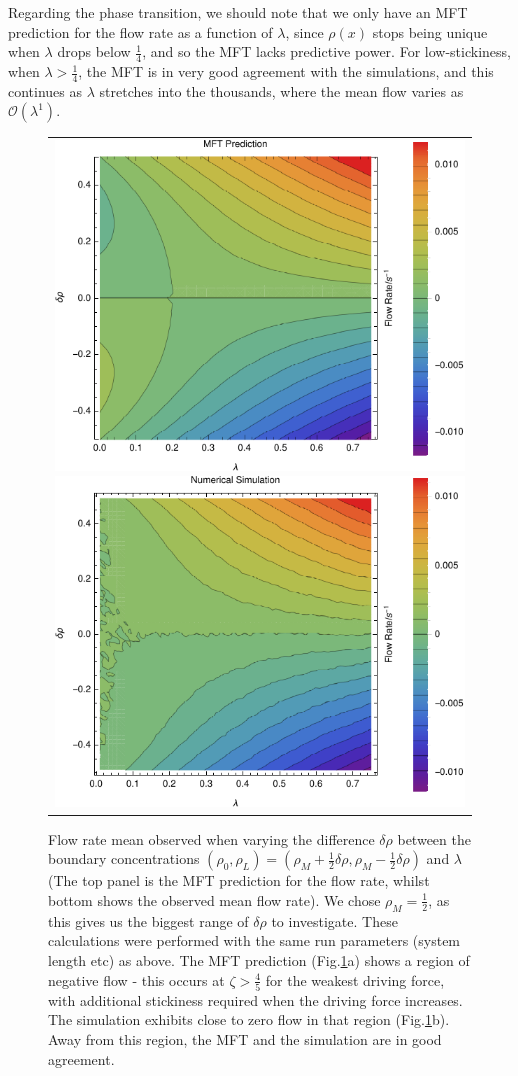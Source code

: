 \documentclass[
reprint, amsmath,amssymb, aps,
]{revtex4-1}
\begin{document}
Regarding the phase transition, we should note that we only have an
MFT prediction for the flow rate as a function of $\lambda$, since
$\rho(x)$ stops being unique when $\lambda$ drops below $\frac{1}{4}$,
and so the MFT lacks predictive power. For low-stickiness, when
$\lambda>\frac{1}{4}$, the MFT is in very good agreement with the
simulations, and this continues as $\lambda$ stretches into the
thousands, where the mean flow varies as $\mathcal{O}(\lambda^1)$.



\begin{figure}[h!]
\vspace{1em}
\begin{center}
 \begin{tabular}{c}
    \includegraphics[width=0.48\linewidth]{newMftPred} 
    \includegraphics[width=0.48\linewidth]{newFlow}
    \end{tabular}
\end{center}
    \vspace{-2.5em}
\caption{\label{fig:constDens} Flow rate mean observed when varying the difference $\delta\rho$ between the boundary concentrations
$(\rho_0, \rho_L) = (\rho_M + \frac{1}{2} \delta\rho, \rho_M - \frac{1}{2} \delta\rho)$ and $\lambda$ (The top panel is the MFT prediction
for the flow rate, whilst bottom shows the observed mean flow rate).
We chose $\rho_M=\frac{1}{2}$, as this gives us the biggest range of $\delta\rho$ to investigate.
These calculations were performed with the same run parameters (system length etc) as above.
The MFT prediction (Fig.\ref{fig:constDens}a) shows a region of
negative flow - this occurs at $\zeta > \frac{4}{5}$ for the weakest
driving force, with additional stickiness required when the driving
force increases. The simulation exhibits close to zero flow in that
region (Fig.\ref{fig:constDens}b).  Away from this region, the MFT and
the simulation are in good agreement.
}
\end{figure}
\end{document}
